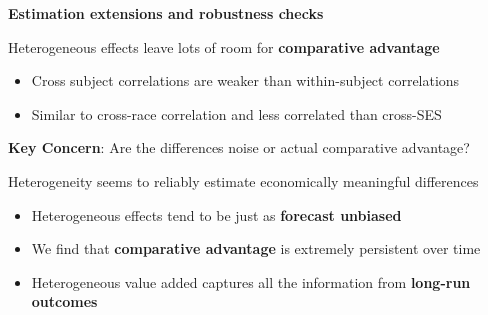 \documentclass[t,aspectratio=169,11pt,presentation]{beamer}
\newenvironment{wideitemize}{\itemize\addtolength{\itemsep}{14pt}}{\enditemize}
\begin{document}
\begin{frame}[label=effects]{\textbf{Estimation extensions and robustness checks}}
\begin{wideitemize}
    \item Heterogeneous effects leave lots of room for \textbf{comparative advantage}
    \begin{itemize}
        \item Cross subject correlations are weaker than within-subject correlations

        \hyperlink{cross}{}
        \item Similar to cross-race correlation and less correlated than cross-SES
        
         {\tiny \color{gray} \citep[]{Delgado2020,bates2022teacher}}
    \end{itemize}

    \item<2->\textbf{Key Concern}: Are the differences noise or actual comparative advantage?

    \item<3-> Heterogeneity seems to reliably estimate economically meaningful differences
    
        \hyperlink{persistence}{}            \hyperlink{longrun}{}
        
    \begin{itemize}
        \item<4-> Heterogeneous effects tend to be just as \textbf{forecast unbiased}
        \item<5-> We find that \textbf{comparative advantage} is extremely persistent over time\hypertarget<5>{effects1}{ }         
        \item<6-> Heterogeneous value added captures all the information from \textbf{long-run outcomes}\hypertarget<6>{effects2}{ } 

    \end{itemize}


\end{wideitemize}
\end{frame}
\end{document}
